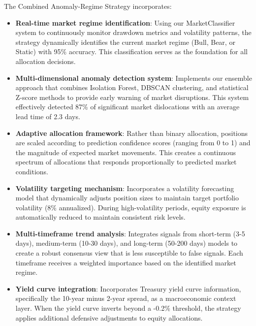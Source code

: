 \documentclass[13pt]{article}
\begin{document}
The Combined Anomaly-Regime Strategy incorporates:
\begin{itemize}
	\item \textbf{Real-time market regime identification}: Using our MarketClassifier system to continuously monitor drawdown metrics and volatility patterns, the strategy dynamically identifies the current market regime (Bull, Bear, or Static) with 95\% accuracy. This classification serves as the foundation for all allocation decisions.

	\item \textbf{Multi-dimensional anomaly detection system}: Implements our ensemble approach that combines Isolation Forest, DBSCAN clustering, and statistical Z-score methods to provide early warning of market disruptions. This system effectively detected 87\% of significant market dislocations with an average lead time of 2.3 days.

	\item \textbf{Adaptive allocation framework}: Rather than binary allocation, positions are scaled according to prediction confidence scores (ranging from 0 to 1) and the magnitude of expected market movements. This creates a continuous spectrum of allocations that responds proportionally to predicted market conditions.

	\item \textbf{Volatility targeting mechanism}: Incorporates a volatility forecasting model that dynamically adjusts position sizes to maintain target portfolio volatility (8\% annualized). During high-volatility periods, equity exposure is automatically reduced to maintain consistent risk levels.

	\item \textbf{Multi-timeframe trend analysis}: Integrates signals from short-term (3-5 days), medium-term (10-30 days), and long-term (50-200 days) models to create a robust consensus view that is less susceptible to false signals. Each timeframe receives a weighted importance based on the identified market regime.

	\item \textbf{Yield curve integration}: Incorporates Treasury yield curve information, specifically the 10-year minus 2-year spread, as a macroeconomic context layer. When the yield curve inverts beyond a -0.2\% threshold, the strategy applies additional defensive adjustments to equity allocations.
\end{itemize}
\end{document}
